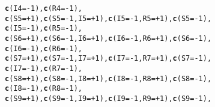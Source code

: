 \documentclass{article}\usepackage[]{graphicx}\usepackage[]{color}
\makeatletter
\newcommand{\hlnum}[1]{\textcolor[rgb]{0.686,0.059,0.569}{#1}}%
\newcommand{\hlopt}[1]{\textcolor[rgb]{0,0,0}{#1}}%
\newcommand{\hlstd}[1]{\textcolor[rgb]{0.345,0.345,0.345}{#1}}%
\newcommand{\hlkwc}[1]{\textcolor[rgb]{0.333,0.667,0.333}{#1}}%
\newcommand{\hlkwd}[1]{\textcolor[rgb]{0.737,0.353,0.396}{\textbf{#1}}}%
\newenvironment{kframe}{%
 \def\at@end@of@kframe{}%
 \ifinner\ifhmode%
  \def\at@end@of@kframe{\end{minipage}}%
  \begin{minipage}{\columnwidth}%
 \fi\fi%
 \def\FrameCommand##1{\hskip\@totalleftmargin \hskip-\fboxsep
 \colorbox{shadecolor}{##1}\hskip-\fboxsep
     \hskip-\linewidth \hskip-\@totalleftmargin \hskip\columnwidth}%
 \MakeFramed {\advance\hsize-\width
   \@totalleftmargin\z@ \linewidth\hsize
   \@setminipage}}%
 {\par\unskip\endMakeFramed%
 \at@end@of@kframe}
\newenvironment{knitrout}{}{} %
\makeatother
\begin{document}
\begin{knitrout}
\begin{kframe}
\begin{alltt}
                    \hlkwd{c}\hlstd{(}\hlkwc{I4} \hlstd{=} \hlopt{-}\hlnum{1}\hlstd{),} \hlkwd{c}\hlstd{(}\hlkwc{R4} \hlstd{=} \hlopt{-}\hlnum{1}\hlstd{),}
                    \hlkwd{c}\hlstd{(}\hlkwc{S5} \hlstd{=} \hlopt{+}\hlnum{1}\hlstd{),} \hlkwd{c}\hlstd{(}\hlkwc{S5} \hlstd{=} \hlopt{-}\hlnum{1}\hlstd{,} \hlkwc{I5}\hlstd{=} \hlopt{+}\hlnum{1}\hlstd{),} \hlkwd{c}\hlstd{(}\hlkwc{I5} \hlstd{=} \hlopt{-}\hlnum{1}\hlstd{,} \hlkwc{R5}\hlstd{=} \hlopt{+}\hlnum{1}\hlstd{),} \hlkwd{c}\hlstd{(}\hlkwc{S5} \hlstd{=} \hlopt{-}\hlnum{1}\hlstd{),}
                    \hlkwd{c}\hlstd{(}\hlkwc{I5} \hlstd{=} \hlopt{-}\hlnum{1}\hlstd{),} \hlkwd{c}\hlstd{(}\hlkwc{R5} \hlstd{=} \hlopt{-}\hlnum{1}\hlstd{),}
                    \hlkwd{c}\hlstd{(}\hlkwc{S6} \hlstd{=} \hlopt{+}\hlnum{1}\hlstd{),} \hlkwd{c}\hlstd{(}\hlkwc{S6} \hlstd{=} \hlopt{-}\hlnum{1}\hlstd{,} \hlkwc{I6}\hlstd{=} \hlopt{+}\hlnum{1}\hlstd{),} \hlkwd{c}\hlstd{(}\hlkwc{I6} \hlstd{=} \hlopt{-}\hlnum{1}\hlstd{,} \hlkwc{R6}\hlstd{=} \hlopt{+}\hlnum{1}\hlstd{),} \hlkwd{c}\hlstd{(}\hlkwc{S6} \hlstd{=} \hlopt{-}\hlnum{1}\hlstd{),}
                    \hlkwd{c}\hlstd{(}\hlkwc{I6} \hlstd{=} \hlopt{-}\hlnum{1}\hlstd{),} \hlkwd{c}\hlstd{(}\hlkwc{R6} \hlstd{=} \hlopt{-}\hlnum{1}\hlstd{),}
                    \hlkwd{c}\hlstd{(}\hlkwc{S7} \hlstd{=} \hlopt{+}\hlnum{1}\hlstd{),} \hlkwd{c}\hlstd{(}\hlkwc{S7} \hlstd{=} \hlopt{-}\hlnum{1}\hlstd{,} \hlkwc{I7}\hlstd{=} \hlopt{+}\hlnum{1}\hlstd{),} \hlkwd{c}\hlstd{(}\hlkwc{I7} \hlstd{=} \hlopt{-}\hlnum{1}\hlstd{,} \hlkwc{R7}\hlstd{=} \hlopt{+}\hlnum{1}\hlstd{),} \hlkwd{c}\hlstd{(}\hlkwc{S7} \hlstd{=} \hlopt{-}\hlnum{1}\hlstd{),}
                    \hlkwd{c}\hlstd{(}\hlkwc{I7} \hlstd{=} \hlopt{-}\hlnum{1}\hlstd{),} \hlkwd{c}\hlstd{(}\hlkwc{R7} \hlstd{=} \hlopt{-}\hlnum{1}\hlstd{),}
                    \hlkwd{c}\hlstd{(}\hlkwc{S8} \hlstd{=} \hlopt{+}\hlnum{1}\hlstd{),} \hlkwd{c}\hlstd{(}\hlkwc{S8} \hlstd{=} \hlopt{-}\hlnum{1}\hlstd{,} \hlkwc{I8}\hlstd{=} \hlopt{+}\hlnum{1}\hlstd{),} \hlkwd{c}\hlstd{(}\hlkwc{I8} \hlstd{=} \hlopt{-}\hlnum{1}\hlstd{,} \hlkwc{R8}\hlstd{=} \hlopt{+}\hlnum{1}\hlstd{),} \hlkwd{c}\hlstd{(}\hlkwc{S8} \hlstd{=} \hlopt{-}\hlnum{1}\hlstd{),}
                    \hlkwd{c}\hlstd{(}\hlkwc{I8} \hlstd{=} \hlopt{-}\hlnum{1}\hlstd{),} \hlkwd{c}\hlstd{(}\hlkwc{R8} \hlstd{=} \hlopt{-}\hlnum{1}\hlstd{),}
                    \hlkwd{c}\hlstd{(}\hlkwc{S9} \hlstd{=} \hlopt{+}\hlnum{1}\hlstd{),} \hlkwd{c}\hlstd{(}\hlkwc{S9} \hlstd{=} \hlopt{-}\hlnum{1}\hlstd{,} \hlkwc{I9}\hlstd{=} \hlopt{+}\hlnum{1}\hlstd{),} \hlkwd{c}\hlstd{(}\hlkwc{I9} \hlstd{=} \hlopt{-}\hlnum{1}\hlstd{,} \hlkwc{R9}\hlstd{=} \hlopt{+}\hlnum{1}\hlstd{),} \hlkwd{c}\hlstd{(}\hlkwc{S9} \hlstd{=} \hlopt{-}\hlnum{1}\hlstd{),}

\end{alltt}
\end{kframe}
\end{knitrout}
\end{document}
